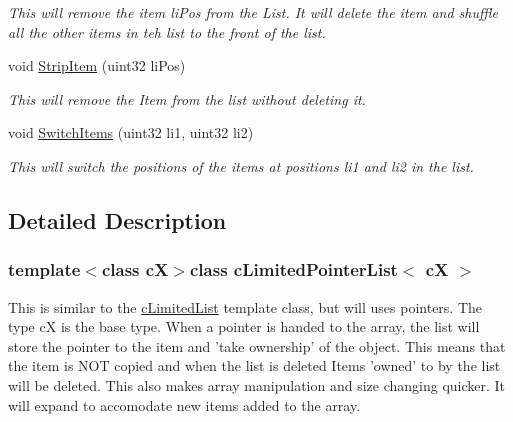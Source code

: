 \begin{DoxyCompactItemize}
\begin{DoxyCompactList}\small\item\em This will remove the item liPos from the List. It will delete the item and shuffle all the other items in teh list to the front of the list. \end{DoxyCompactList}\item 
\hypertarget{classc_limited_pointer_list_aaa97c52b1c2752bbd2020e08348cd3a6}{
void \hyperlink{classc_limited_pointer_list_aaa97c52b1c2752bbd2020e08348cd3a6}{StripItem} (uint32 liPos)}
\label{classc_limited_pointer_list_aaa97c52b1c2752bbd2020e08348cd3a6}

\begin{DoxyCompactList}\small\item\em This will remove the Item from the list without deleting it. \end{DoxyCompactList}\item 
\hypertarget{classc_limited_pointer_list_ad2981a22dcb5e79790b8644125cc7322}{
void \hyperlink{classc_limited_pointer_list_ad2981a22dcb5e79790b8644125cc7322}{SwitchItems} (uint32 li1, uint32 li2)}
\label{classc_limited_pointer_list_ad2981a22dcb5e79790b8644125cc7322}

\begin{DoxyCompactList}\small\item\em This will switch the positions of the items at positions li1 and li2 in the list. \end{DoxyCompactList}\end{DoxyCompactItemize}


\subsection{Detailed Description}
\subsubsection*{template$<$class cX$>$class cLimitedPointerList$<$ cX $>$}

This is similar to the \hyperlink{classc_limited_list}{cLimitedList} template class, but will uses pointers. The type cX is the base type. When a pointer is handed to the array, the list will store the pointer to the item and 'take ownership' of the object. This means that the item is NOT copied and when the list is deleted Items 'owned' to by the list will be deleted. This also makes array manipulation and size changing quicker. It will expand to accomodate new items added to the array. 